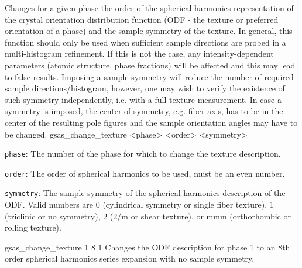 {
Changes for a given phase the order of the spherical harmonics representation of the crystal orientation distribution function (ODF - the texture or preferred orientation of a phase) and the sample symmetry of the texture. In general, this function should only be used when sufficient sample directions are probed in a multi-histogram refinement. If this is not the case, any intensity-dependent parameters (atomic structure, phase fractions) will be affected and this may lead to false results. Imposing a sample symmetry will reduce the number of required sample directions/histogram, however, one may wish to verify the existence of such symmetry independently, i.e. with a full texture measurement. In case a symmetry is imposed, the center of symmetry, e.g. fiber axis, has to be in the center of the resulting pole figures and the sample orientation angles may have to be changed.
}{
gsas\_change\_texture <phase> <order> <symmetry>
}{
\item \texttt{phase}: The number of the phase for which to change the texture description.
\item \texttt{order}: The order of spherical harmonics to be used, must be an even number.
\item \texttt{symmetry}: The sample symmetry of the spherical harmonics description of the ODF. Valid numbers are 0 (cylindrical symmetry or single fiber texture), 1 (triclinic or no symmetry), 2 (2/m or shear texture), or mmm (orthorhombic or rolling texture).
}{
gsas\_change\_texture 1 8 1
}{
Changes the ODF description for phase 1 to an 8th order spherical harmonics series expansion with no sample symmetry.
}

